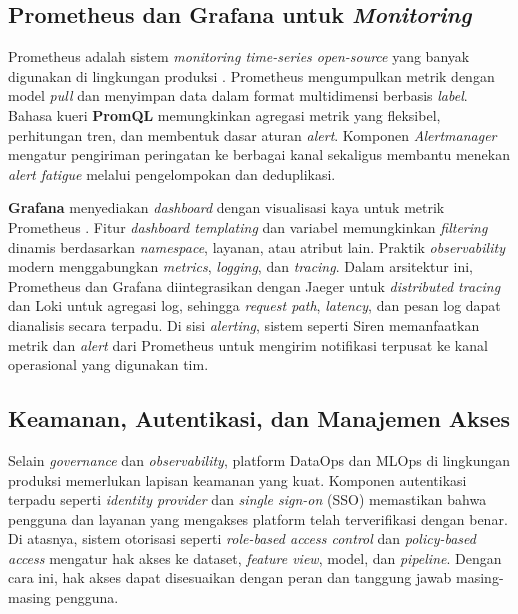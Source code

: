 \subsection{Prometheus dan Grafana untuk \textit{Monitoring}}
\label{sec:prometheus_grafana}

Prometheus adalah sistem \textit{monitoring time-series open-source} yang banyak digunakan di lingkungan produksi \autocite{prometheus2024}. Prometheus mengumpulkan metrik dengan model \textit{pull} dan menyimpan data dalam format multidimensi berbasis \textit{label}. Bahasa kueri \textbf{PromQL} memungkinkan agregasi metrik yang fleksibel, perhitungan tren, dan membentuk dasar aturan \textit{alert}. Komponen \textit{Alertmanager} mengatur pengiriman peringatan ke berbagai kanal sekaligus membantu menekan \textit{alert fatigue} melalui pengelompokan dan deduplikasi.

\textbf{Grafana} menyediakan \textit{dashboard} dengan visualisasi kaya untuk metrik Prometheus \autocite{grafana2024}. Fitur \textit{dashboard templating} dan variabel memungkinkan \textit{filtering} dinamis berdasarkan \textit{namespace}, layanan, atau atribut lain. Praktik \textit{observability} modern menggabungkan \textit{metrics}, \textit{logging}, dan \textit{tracing}. Dalam arsitektur ini, Prometheus dan Grafana diintegrasikan dengan Jaeger \autocite{jaeger2024} untuk \textit{distributed tracing} dan Loki \autocite{loki2024} untuk agregasi log, sehingga \textit{request path}, \textit{latency}, dan pesan log dapat dianalisis secara terpadu. Di sisi \textit{alerting}, sistem seperti Siren \autocite{raystack2025siren} memanfaatkan metrik dan \textit{alert} dari Prometheus untuk mengirim notifikasi terpusat ke kanal operasional yang digunakan tim.

\subsection{Keamanan, Autentikasi, dan Manajemen Akses}

Selain \textit{governance} dan \textit{observability}, platform DataOps dan MLOps di lingkungan produksi memerlukan lapisan keamanan yang kuat. Komponen autentikasi terpadu seperti \textit{identity provider} dan \textit{single sign-on} (SSO) memastikan bahwa pengguna dan layanan yang mengakses platform telah terverifikasi dengan benar. Di atasnya, sistem otorisasi seperti \textit{role-based access control} dan \textit{policy-based access} mengatur hak akses ke dataset, \textit{feature view}, model, dan \textit{pipeline}. Dengan cara ini, hak akses dapat disesuaikan dengan peran dan tanggung jawab masing-masing pengguna.

